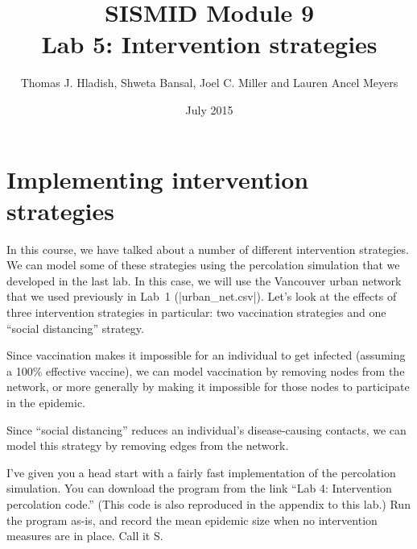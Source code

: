 \documentclass{article}
\begin{document}
\title{SISMID Module 9\\Lab 5: Intervention strategies}
\author{Thomas J. Hladish, Shweta Bansal, Joel C. Miller and Lauren Ancel Meyers}
\date{July 2015}
\maketitle


\section*{Implementing intervention strategies}

In this course, we have talked about a number of different intervention strategies. We can model some of these 
strategies using the percolation simulation that we developed in the last lab.  In this case, we will use
the Vancouver urban network that we used previously in Lab~1 (|urban_net.csv|).  Let's look at the effects of
three intervention strategies in particular: two vaccination strategies and one ``social distancing'' strategy.

Since vaccination makes it impossible for an individual to get infected (assuming a 100\% effective vaccine), we can
model vaccination by removing nodes from the network, or more generally by making it impossible for those nodes to participate in the epidemic.

Since ``social distancing'' reduces an individual's disease-causing contacts, we can model this strategy by
removing edges from the network.

I've given you a head start with a fairly fast implementation of the percolation simulation.  You can download the program 
from the link ``Lab 4: Intervention percolation code.''  (This code is also reproduced in the appendix to this lab.)  Run the program as-is,
and record the mean epidemic size when no intervention measures are in place.  Call it S.
\end{document}
